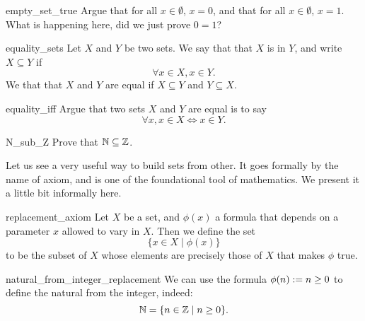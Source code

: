 \begin{cex}{}{empty_set_true}
    Argue that for all \( x \in \emptyset \), \( x = 0 \), and that for all \( x \in \emptyset \), \( x = 1 \). What is happening here, did we just prove \( 0 = 1 \)?
\end{cex}
\begin{cdef}{}{equality_sets}
    Let \( X \) and \( Y \) be two sets. We say that that \( X \) is  in \( Y \), and write \( X \subseteq Y \) if
    \begin{equation*}
        \forall x \in X, x \in Y.
    \end{equation*}
    We that that \( X \) and \( Y \) are equal if \( X \subseteq Y \) and \( Y \subseteq X \).
\end{cdef}

\begin{cex}{}{equality_iff}
    Argue that two sets \( X \) and \( Y \) are equal is to say
    \begin{equation*}
        \forall x, x \in X \iff x \in Y.
    \end{equation*}    
\end{cex}

\begin{cex}{}{N_sub_Z}
    Prove that \( \mathbb{N} \subseteq \mathbb{Z} \).
\end{cex}

Let us see a very useful way to build sets from other. It goes formally by the name of  axiom, and is one of the foundational tool of mathematics. We present it a little bit informally here. 
\begin{cdef}{}{replacement_axiom}
    Let \( X \) be a set, and \( \phi(x) \) a formula that depends on a parameter \( x \) allowed to vary in \( X \). Then we define the set
    \begin{equation*}
        \{ x \in X \mid \phi(x) \}    
    \end{equation*}
    to be the subset of \( X \) whose elements are precisely those of \( X \) that makes \( \phi \) true.
\end{cdef}

\begin{cexp}{}{natural_from_integer_replacement}
    We can use the formula \( \phi(n) := n \geq 0 \) to define the natural from the integer, indeed:
    \begin{equation*}
        \mathbb{N} = \{ n \in \mathbb{Z} \mid n \geq 0 \}.
    \end{equation*}
\end{cexp}

